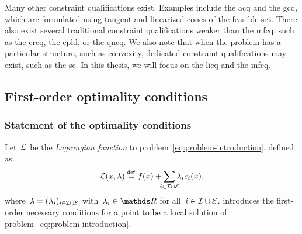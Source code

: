 Many other constraint qualifications exist.
Examples include the \gls{acq} and the \gls{gcq}, which are formulated using tangent and linearized cones of the feasible set.
There also exist several traditional constraint qualifications weaker than the \gls{mfcq}, such as the \gls{crcq}, the \gls{cpld}, or the \gls{qncq}.
We also note that when the problem has a particular structure, such as convexity, dedicated constraint qualifications may exist, such as the \gls{sc}.
In this thesis, we will focus on the \gls{licq} and the \gls{mfcq}.

\subsection{First-order optimality conditions}

\subsubsection{Statement of the optimality conditions}

Let~$\mathcal{L}$ be the \emph{Lagrangian function} to problem~\cref{eq:problem-introduction}, defined as
\begin{equation*}
    \lag(x, \lambda) \eqdef \obj(x) + \sum_{\mathclap{i \in \iub \cup \ieq}} \lambda_i \con{i}(x),
\end{equation*}
where~$\lambda = (\lambda_i)_{i \in \mathcal{I} \cup \mathcal{E}}$ with~$\lambda_i \in \R$ for all~$i \in \mathcal{I} \cup \mathcal{E}$.
 introduces the first-order necessary conditions for a point to be a local solution of problem~\cref{eq:problem-introduction}.

